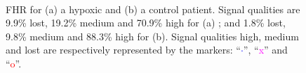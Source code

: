 \begin{figure}[tp]
\centering%
\\%
\caption{FHR for (a) a hypoxic and (b) a control patient. Signal qualities are 9.9\% lost, 19.2\% medium and 70.9\% high for (a) ; and 1.8\% lost, 9.8\% medium and 88.3\% high for (b).  Signal qualities  high, medium and lost  are respectively represented by the markers: ``\textcolor{blue}{$\cdot$}'', ``\textcolor{magenta}{x}'' and ``\textcolor{red}{o}''.}
\label{fig:RAWFHR}
\end{figure}
 
